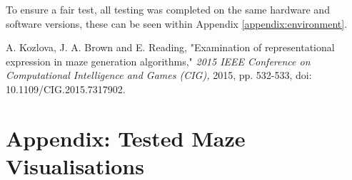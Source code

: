 \documentclass[twoside, 12pt, a4paper]{article}
\begin{document}
To ensure a fair test, all testing was completed on the same hardware and software versions, these can be seen within Appendix \ref{appendix:environment}.
\newpage

\begin{thebibliography}{9}
A. Kozlova, J. A. Brown and E. Reading, "Examination of representational expression in maze generation algorithms," \textit{2015 IEEE Conference on Computational Intelligence and Games (CIG),} 2015, pp. 532-533, doi: 10.1109/CIG.2015.7317902.
\end{thebibliography}

\newpage
\appendix
\section{Appendix: Tested Maze Visualisations} \label{appendix:mazes}
\end{document}
